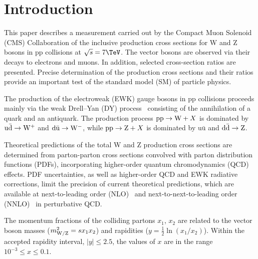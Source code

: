 \section{Introduction}
\label{sec:introduction}

This paper describes a measurement carried out by the Compact Muon Solenoid (CMS) Collaboration
of the inclusive production cross sections for W and Z bosons in pp collisions at
$\sqrt{s} = 7\TeV$. The vector bosons are observed  via their decays to electrons and muons.
In addition, selected cross-section ratios are presented. Precise determination
of the production cross sections and their ratios provide an important
test of the standard model (SM) of particle physics.

The production of the electroweak (EWK) gauge bosons in pp collisions 
proceeds mainly via the weak Drell--Yan (DY) process~\cite{DY} consisting of
the annihilation of a quark and an antiquark.
The production process $\mathrm{pp} \rightarrow \mathrm{W} + X$ is dominated by  
$\mathrm{u}\bar{\mathrm{d}}\rightarrow\mathrm{W^+}$ and $\mathrm{d}\bar{\mathrm{u}}\rightarrow\mathrm{W^-}$, 
while  $\mathrm{pp} \rightarrow \mathrm{Z} + X$ is dominated by $\mathrm{u}\bar{\mathrm{u}}$ and
$\mathrm{d}\bar{\mathrm{d}}\rightarrow\mathrm{Z}$.

Theoretical predictions of the total W and Z production cross sections
are determined from parton-parton cross sections convolved with parton 
distribution functions (PDFs), incorporating higher-order quantum chromodynamics (QCD) effects. 
PDF uncertainties, as well as higher-order QCD and EWK radiative corrections,
limit the precision of current theoretical predictions, which are available at 
next-to-leading order (NLO)~\cite{nlo1, nlo2, nlo3} and next-to-next-to-leading order 
(NNLO)~\cite{nnlo1, nnlo2, nnlo3, nnlo4, nnlo5} in perturbative QCD.

The momentum fractions of the colliding partons $x_1$, $x_2$ are related to the
vector boson masses ($m_{\mathrm{W}/\mathrm{Z}}^{2} = s x_1 x_2$) and
rapidities ($y = \frac{1}{2}\ln(x_1/x_2)$). 
Within the accepted rapidity interval, $ | y | \le 2.5$, the values 
of $x$ are in the range $10^{-3} \le x \le 0.1$.


